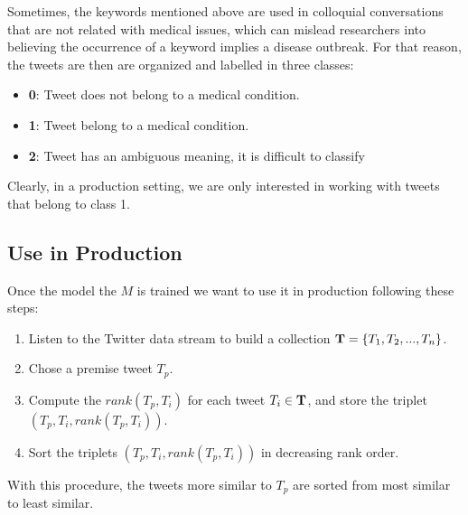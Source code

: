 \documentclass[12pt]{report}
\begin{document}
Sometimes, the keywords mentioned above are used in colloquial conversations that are not related with medical 
issues, which can mislead researchers into believing the occurrence of a keyword implies a disease outbreak. 
For that reason, the tweets are then are organized and labelled in three classes:

\begin{itemize}[nolistsep]
	\item \textbf{0}: Tweet does not belong to a medical condition.
	\item  \textbf{1}: Tweet belong to a medical condition.
	\item \textbf{2}: Tweet has an ambiguous meaning, it is difficult to classify 
\end{itemize}
Clearly, in a production setting, we are only interested in working with tweets that belong to class 1. 

\subsection{Use in Production}
Once the model the $M$ is trained we want to use it in production following these steps:

\begin{enumerate}
	\item Listen to the Twitter data stream to build a collection ${\bf T} = \{T_1, T_2, ..., T_n\}$.
	\item Chose a premise tweet $T_p$.
	\item Compute the $rank(T_p, T_i) $ for each tweet $T_i \in {\bf T}$, and store the triplet $(T_p, T_i, rank(T_p, T_i))$.
	\item Sort the triplets $(T_p, T_i, rank(T_p, T_i))$ in decreasing rank order.
\end{enumerate}
With this procedure, the tweets more similar to $T_p$ are sorted from most similar to least similar. 

%
%
\end{document}
